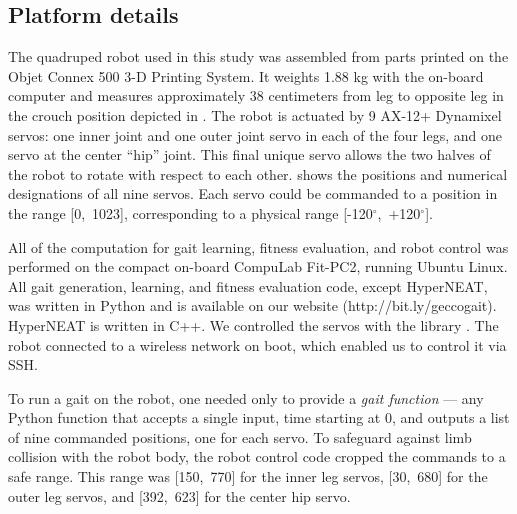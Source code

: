 \subsection{Platform details}






The quadruped robot used in this study was assembled from parts
printed on the Objet Connex 500 3-D Printing System. It weights 1.88
kg with the on-board computer and measures approximately 38
centimeters from leg to opposite leg in the crouch position depicted
in . The robot is actuated by 9 AX-12+
Dynamixel servos: one inner joint and one outer joint servo in each of
the four legs, and one servo at the center ``hip'' joint.  This final
unique servo allows the two halves of the robot to rotate with respect
to each other.  shows the positions and numerical
designations of all nine servos.  Each servo could be commanded to a
position in the range [0,~1023], corresponding to a physical range
[-120$^{\circ}$,~+120$^{\circ}$].

All of the computation for gait learning, fitness evaluation, and
robot control was performed on the compact on-board CompuLab Fit-PC2,
running Ubuntu Linux.  All gait generation, learning, and fitness
evaluation code, except HyperNEAT, was written in Python and is
available on our website (http://bit.ly/geccogait).  HyperNEAT is written in
C++.  We controlled the servos with the  library
\cite{pydynamixel}.  The robot connected to a wireless network on
boot, which enabled us to control it via SSH.


To run a gait on the robot, one needed only to provide a \emph{gait
  function} --- any Python function that accepts a single input, time
starting at 0, and outputs a list of nine commanded positions, one for
each servo.  To safeguard against limb collision with the robot body,
the robot control code cropped the commands to a safe range.  This
range was [150,~770] for the inner leg servos, [30,~680] for the outer
leg servos, and [392,~623] for the center hip servo.





